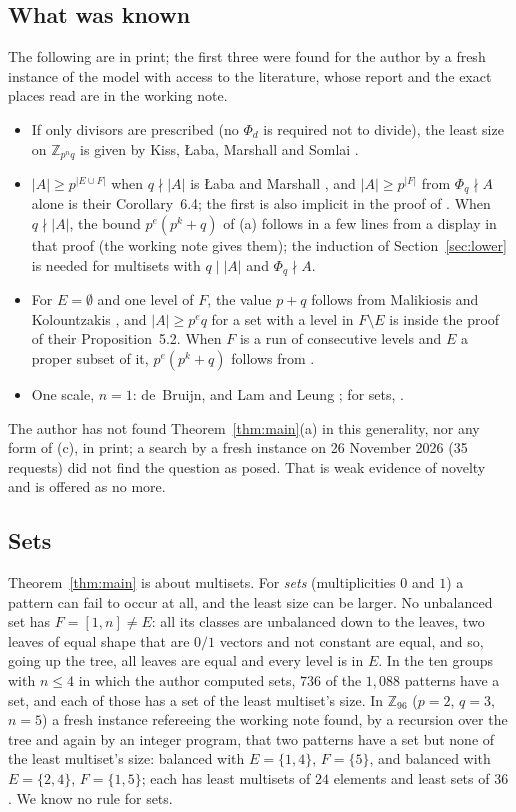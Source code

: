 \documentclass[11pt,a4paper]{amsart}
\theoremstyle{definition}
\theoremstyle{remark}
\newcommand{\Z}{\mathbb{Z}}
\begin{document}
\subsection{What was known} The following are in print; the first three were found for the author by a
fresh instance of the model with access to the literature, whose report and the exact places read are in the
working note.
\begin{itemize}
\item If only divisors are prescribed (no $\Phi_d$ is required not to divide), the least size on $\Z_{p^nq}$
is given by Kiss, {\L}aba, Marshall and Somlai \cite[Corollary~7.3]{KLaMS}.
\item $|A|\ge p^{|E\cup F|}$ when $q\nmid|A|$ is {\L}aba and Marshall \cite[Theorem~1.2]{LaM}, and
$|A|\ge p^{|F|}$ from $\Phi_q\nmid A$ alone is their Corollary~6.4; the first is also implicit in the proof of
\cite[Theorem~6.1]{Mal}. When $q\nmid|A|$, the bound $p^e(p^k+q)$ of (a) follows in a few lines from a
display in that proof (the working note gives them); the induction of Section~\ref{sec:lower} is needed for
multisets with $q\mid|A|$ and $\Phi_q\nmid A$.
\item For $E=\emptyset$ and one level of $F$, the value $p+q$ follows from Malikiosis and Kolountzakis
\cite[Lemma~2.5, Proposition~2.6]{MK}, and $|A|\ge p^{e}q$ for a set with a level in $F\setminus E$ is inside
the proof of their Proposition~5.2. When $F$ is a run of consecutive levels and $E$ a proper subset of it,
$p^e(p^k+q)$ follows from \cite[Proposition~6.3 and Lemma~6.2]{KLaMS}.
\item One scale, $n=1$: de~Bruijn, and Lam and Leung \cite{LL}; for sets, \cite[Proposition~3.8]{KMSV}.
\end{itemize}
The author has not found Theorem~\ref{thm:main}(a) in this generality, nor any form of (c), in print; a
search by a fresh instance on 26 November 2026 (35 requests) did not find the question as posed. That is
weak evidence of novelty and is offered as no more.

\subsection{Sets} Theorem~\ref{thm:main} is about multisets. For \emph{sets} (multiplicities $0$ and $1$)
a pattern can fail to occur at all, and the least size can be larger. No unbalanced set has $F=[1,n]\ne E$:
all its classes are unbalanced down to the leaves, two leaves of equal shape that are $0/1$ vectors and not
constant are equal, and so, going up the tree, all leaves are equal and every level is in $E$. In the ten
groups with $n\le4$ in which the author computed sets, $736$ of the $1{,}088$ patterns have a set, and each
of those has a set of the least multiset's size. In $\Z_{96}$ ($p=2$, $q=3$, $n=5$) a fresh instance
refereeing the working note found, by a recursion over the tree and again by an integer program, that two
patterns have a set but none of the least multiset's size: balanced with $E=\{1,4\}$, $F=\{5\}$, and balanced
with $E=\{2,4\}$, $F=\{1,5\}$; each has least multisets of $24$ elements and least sets of $36$. We know no
rule for sets.
\end{document}
